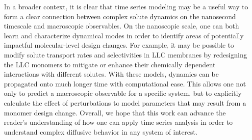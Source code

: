 \documentclass[journal=ancac3,manuscript=article,layout=twocolumn]{achemso}
\begin{document}
  
  In a broader context, it is clear that time series modeling may be a useful way
  to form a clear connection between complex solute dynamics on the nanosecond 
  timescale and macroscopic observables. On the nanoscopic scale, one can both 
  learn and characterize dynamical modes in order to identify areas of potentially
  impactful molecular-level design changes. For example, it may be possible to 
  modify solute transport rates and selectivities in LLC membranes by redesigning 
  the LLC monomers to mitigate or enhance their chemically dependent interactions
  with different solutes. With these models, dynamics can be propagated onto much 
  longer time with computational ease. This allows one not only to predict a 
  macroscopic observable for a specific system, but to explicitly calculate the 
  effect of perturbations to model parameters that may result from a monomer 
  design change. Overall, we hope that this work can advance the reader's 
  understanding of how one can apply time series analysis in order to understand 
  complex diffusive behavior in any system of interest.
  
%
\end{document}
